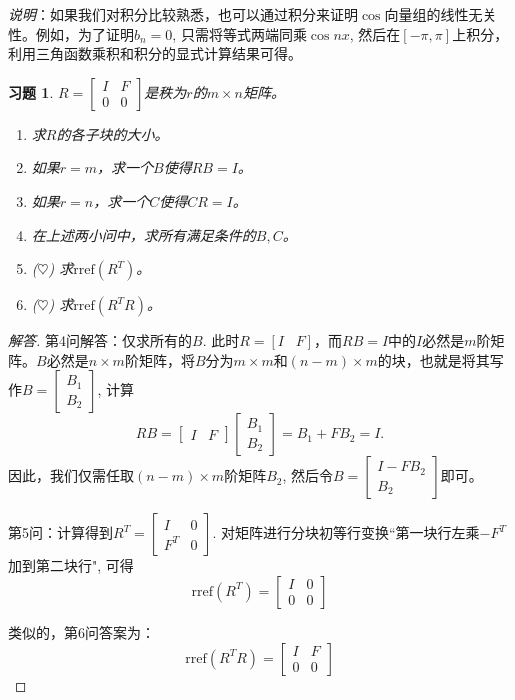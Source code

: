 \documentclass[UTF8]{ctexart}
\newcommand{\rref}{\mathrm{rref}}
\newtheorem{ex}[thm]{习题}
\begin{document}
\noindent\emph{说明}：如果我们对积分比较熟悉，也可以通过积分来证明$\cos$向量组的线性无关性。例如，为了证明$b_n =0$, 只需将等式两端同乘$\cos nx$, 然后在$[-\pi,\pi]$上积分，利用三角函数乘积和积分的显式计算结果可得。




\begin{ex}
		$R=\begin{bmatrix}
		I & F\\ 0&0
	\end{bmatrix}$是秩为$r$的$m\times n$矩阵。
	\begin{enumerate}
		\item 求$R$的各子块的大小。
			\item 如果$r=m$，求一个$B$使得$RB=I$。
			\item 如果$r=n$，求一个$C$使得$CR=I$。
			\item 在上述两小问中，求所有满足条件的$B,C$。
		\item {($\heartsuit  $)} 求$\rref(R^T)$。
		\item {($\heartsuit  $)} 求$\rref(R^TR)$。
	\end{enumerate}
\end{ex}

\begin{proof}[解答] 第4问解答：仅求所有的$B$. 此时$R = [I \;\;\;F]$，而$RB=I$中的$I$必然是$m$阶矩阵。$B$必然是$n\times m$阶矩阵，将$B$分为$m\times m$和$(n-m)\times m$的块，也就是将其写作$B = \begin{bmatrix}B_1\\B_2\end{bmatrix}$, 计算
\begin{equation*}
RB = \begin{bmatrix} I & F\end{bmatrix} \begin{bmatrix} B_1 \\ B_2\end{bmatrix} = B_1 + FB_2 = I.
\end{equation*}
因此，我们仅需任取$(n-m)\times m$阶矩阵$B_2$, 然后令$B=\begin{bmatrix} I-FB_2\\ B_2\end{bmatrix}$即可。

第5问：计算得到$R^T = \begin{bmatrix} I & 0\\F^T & 0\end{bmatrix}$. 对矩阵进行分块初等行变换``第一块行左乘$-F^T$加到第二块行", 可得
\begin{equation*}
\rref(R^T) = \begin{bmatrix} I & 0\\0 & 0\end{bmatrix}
\end{equation*}

类似的，第6问答案为：
\begin{equation*}
\rref(R^T R) = \begin{bmatrix} I & F\\0 & 0\end{bmatrix}
\end{equation*}
\end{proof}
\end{document}
